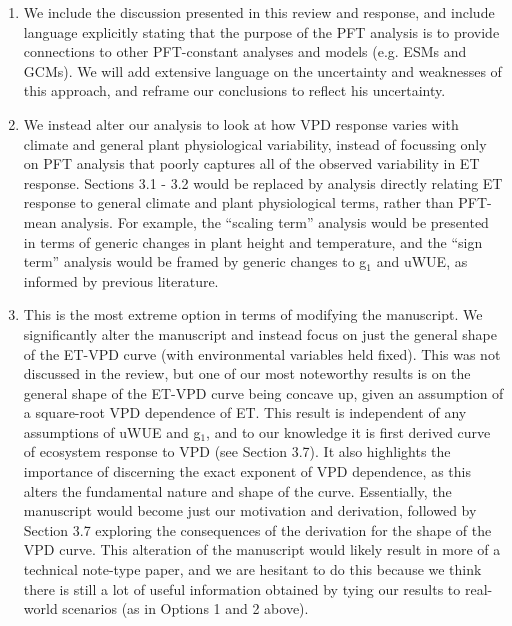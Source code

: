 \documentclass[12pt]{article}
\begin{document}
\begin{enumerate}
\item We include the discussion presented in this review and response,
  and include language explicitly stating that the purpose of the PFT
  analysis is to provide connections to other PFT-constant analyses
  and models (e.g. ESMs and GCMs). We will add extensive language on
  the uncertainty and weaknesses of this approach, and reframe our
  conclusions to reflect his uncertainty.
\item We instead alter our analysis to look at how VPD response varies
  with climate and general plant physiological variability, instead of
  focussing only on PFT analysis that poorly captures all of the observed
  variability in ET response. Sections 3.1 - 3.2 would be replaced by
  analysis directly relating ET response to general climate and plant
  physiological terms, rather than PFT-mean analysis. For example, the
  ``scaling term'' analysis would be presented in terms of generic
  changes in plant height and temperature, and the ``sign term''
  analysis would be framed by generic changes to g$_1$ and uWUE, as
  informed by previous literature.
\item This is the most extreme option in terms of modifying the
  manuscript. We significantly alter the manuscript and instead focus
  on just the general shape of the ET-VPD curve (with environmental
  variables held fixed). This was not discussed in the review, but one
  of our most noteworthy results is on the general shape of the ET-VPD
  curve being concave up, given an assumption of a square-root VPD
  dependence of ET. This result is independent of any assumptions of
  uWUE and g$_1$, and to our knowledge it is first derived curve of
  ecosystem response to VPD (see Section 3.7). It also highlights the
  importance of discerning the exact exponent of VPD dependence, as
  this alters the fundamental nature and shape of the
  curve. Essentially, the manuscript would become just our motivation
  and derivation, followed by Section 3.7 exploring the consequences
  of the derivation for the shape of the VPD curve. This alteration of
  the manuscript would likely result in more of a technical note-type
  paper, and we are hesitant to do this because we think there is
  still a lot of useful information obtained by tying our results to
  real-world scenarios (as in Options 1 and 2 above).
\end{enumerate}
\end{document}
